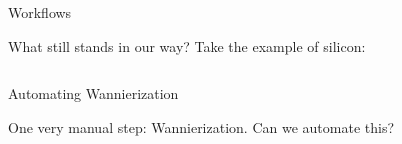 \documentclass[xcolor=table,aspectratio=169]{beamer}
\numberwithin{equation}{section}
\begin{document}
\begin{frame}{Workflows}

   What still stands in our way? Take the example of silicon:

   \vspace{-1ex}
   \inputminted[fontsize=\scriptsize]{json}{scripts/si.json}

\end{frame}

\begin{frame}{Automating Wannierization}

   One very manual step: Wannierization. Can we automate this?

   \begin{figure}[t]
      \begin{subfigure}{0.2\textwidth}
\end{subfigure}
\end{figure}
\end{frame}
\end{document}
